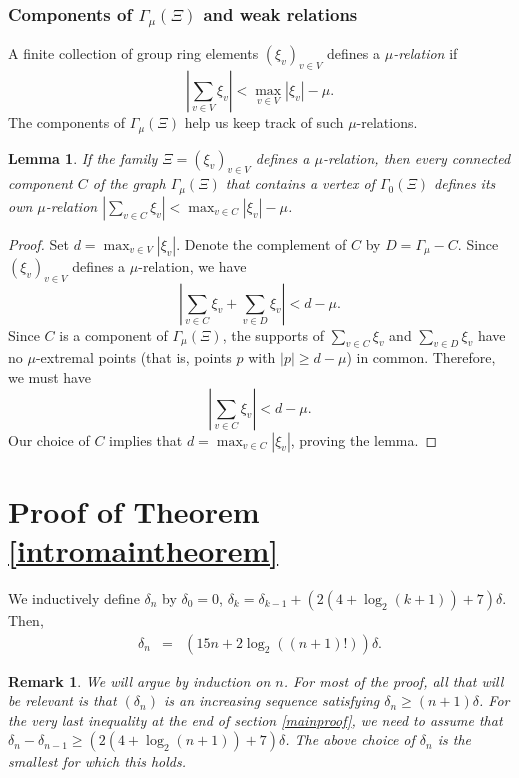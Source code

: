 \documentclass[11pt,letterpaper]{amsart}
\newtheorem{lemma}[theorem]{Lemma}
\newtheorem*{remark}{Remark}
\begin{document}
\subsubsection*{Components of $\Gamma_{\mu}(\Xi)$ and weak relations}
A finite collection of group ring elements $(\xi_v)_{v\in V}$ defines a {\it $\mu$-relation} if 
\begin{equation*}
\label{murelation}
\left|\sum_{v\in V}\xi_v\right|<\max_{v\in V}|\xi_v|-\mu.
\end{equation*}
The components of $\Gamma_{\mu}(\Xi)$ help us keep track of such $\mu$-relations.

\begin{lemma}
\label{relationcomponents}
If the family $\Xi=(\xi_v)_{v\in V}$ defines a $\mu$-relation, then every connected component $C$ of the graph $\Gamma_{\mu}(\Xi)$ that contains a vertex of $\Gamma_0(\Xi)$ defines its own $\mu$-relation $|\sum_{v\in C}\xi_v|<\max_{v\in C}|\xi_v|-\mu$. 
\end{lemma}
\begin{proof}
Set $d=\max_{v\in V}|\xi_v|$. Denote the complement of $C$ by $D=\Gamma_{\mu}-C$. Since $(\xi_v)_{v\in V}$ defines a $\mu$-relation, we have 
$$
\left|\sum _{v\in C}\xi_v+\sum_{v\in D}\xi_v\right|<d-\mu.
$$ 
Since $C$ is a component of $\Gamma_{\mu}(\Xi)$, the supports of $\sum_{v\in C}\xi_v$ and $\sum_{v\in D}\xi_v$ have no $\mu$-extremal points (that is, points $p$ with $|p|\geq d-\mu$) in common. Therefore, we must have
$$
\left|\sum _{v\in C}\xi_v\right|<d-\mu.
$$
Our choice of $C$ implies that $d=\max_{v\in C}|\xi_v|$, proving the lemma.  
\end{proof}






\section{Proof of Theorem \ref{intromaintheorem}\label{mainproof}}
We inductively define $\delta_n$ by $\delta_0=0$, $\delta_k=\delta_{k-1}+(2(4+\log_2(k+1))+7)\delta$. Then, \begin{eqnarray*}
\delta_n%
&=&(15n+2\log_2((n+1)!))\delta.
\end{eqnarray*}
\begin{remark}
We will argue by induction on $n$. 
For most of the proof, all that will be relevant is that $(\delta_n)$ is an increasing sequence satisfying $\delta_n\geq(n+1)\delta$. For the very last inequality at the end of section \ref{mainproof}, we need to assume that $\delta_n-\delta_{n-1}\geq (2(4+\log_2(n+1))+7)\delta$. The above choice of $\delta_n$ is the smallest for which this holds.  
\end{remark}
\end{document}
